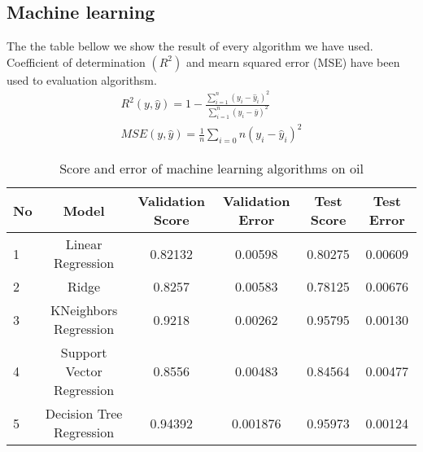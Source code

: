 \documentclass[english]{article}
\begin{document}
\subsection{Machine learning}
The the table bellow we show the result of every algorithm we have used. Coefficient of determination $(R^2)$ and mearn squared error (MSE) have been used to evaluation algorithsm.
\begin{align*}
R^{2}(y,\hat y) = 1 - \frac{\sum_{i = 1}^{n} (y_{i} - \hat y_{i})^2}{\sum_{i = 1}^{n} (y_{i} - \bar y)^2} \\
MSE(y,\hat y) = \frac{1}{n}\sum_{i=0}{n}(y_{i} - \hat y_{i})^2
\end{align*}


\begin{table}[H]
\centering
\caption{Score and error of machine learning algorithms on oil}
\begin{tabular}{|l|c|c|c|c|c|}
\hline
\textbf{No} & \textbf{Model} & \textbf{Validation Score} & \textbf{Validation Error} & \textbf{Test Score} & \textbf{Test Error} \\ \hline
1           & Linear Regression                        & 0.82132                                             & 0.00598                                             & 0.80275                                       & 0.00609                                       \\ \hline
2           & Ridge                                    & 0.8257                                              & 0.00583                                             & 0.78125                                       & 0.00676                                       \\ \hline
3           & KNeighbors Regression                    & 0.9218                                              & 0.00262                                             & 0.95795                                       & 0.00130                                       \\ \hline
4           & Support Vector Regression                & 0.8556                                              & 0.00483                                             & 0.84564                                       & 0.00477                                       \\ \hline
5           & Decision Tree Regression                 & 0.94392                                             & 0.001876                                            & 0.95973                                       & 0.00124                                       \\ \hline

\end{tabular}
\end{table}
\end{document}
